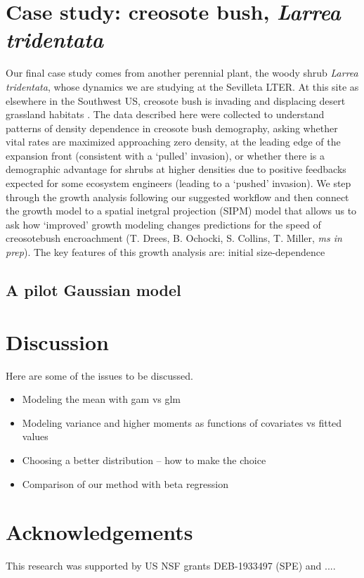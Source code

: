 \documentclass[12pt]{article}
\begin{document}
\section{Case study: creosote bush, \emph{Larrea tridentata}}
Our final case study comes from another perennial plant, the woody shrub \emph{Larrea tridentata}, whose dynamics we are studying at the Sevilleta LTER. 
At this site as elsewhere in the Southwest US, creosote bush is invading and displacing desert grassland habitats \citep{}.
The data described here were collected to understand patterns of density dependence in creosote bush demography, asking whether vital rates are maximized approaching zero density, at the leading edge of the expansion front (consistent with a `pulled' invasion), or whether there is a demographic advantage for shrubs at higher densities due to positive feedbacks expected for some ecosystem engineers (leading to a `pushed' invasion). 
We step through the growth analysis following our suggested workflow and then connect the growth model to a spatial inetgral projection (SIPM)  model that allows us to ask how `improved' growth modeling changes predictions for the speed of creosotebush encroachment (T. Drees, B. Ochocki, S. Collins, T. Miller, \textit{ms in prep}). 
The key features of this growth analysis are: initial size-dependence 

\subsection{A pilot Gaussian model}


\section{Discussion}

Here are some of the issues to be discussed.
\begin{itemize}
\item{Modeling the mean with gam vs glm}
\item{Modeling variance and higher moments as functions of covariates vs fitted values}
\item{Choosing a better distribution -- how to make the choice}
\item{Comparison of our method with beta regression}

\end{itemize}

\section*{Acknowledgements} 
This research was supported by US NSF grants DEB-1933497 (SPE) and .... 
\end{document}
